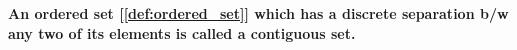 \documentclass[../main.tex]{subfiles}
\begin{document}
\begin{definition}
  \label{def:contiguous_set}

  \textbf{An ordered set [\ref{def:ordered_set}] which has a discrete separation b/w any two of its elements is called a contiguous set.}

\end{definition}

\pagebreak
\end{document}
